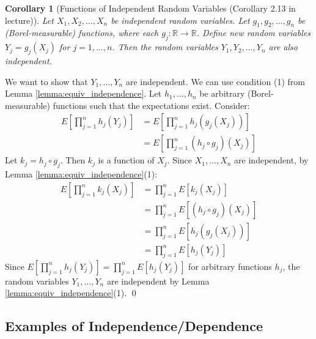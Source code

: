 \documentclass[11pt]{article}
\newtheorem{corollary}[theorem]{Corollary}
\renewenvironment{proof}{{\bfseries Proof.}}{\qed\par\bigskip}
\begin{document}
\begin{corollary}[Functions of Independent Random Variables (Corollary 2.13 in lecture)]
\label{cor:functions_independent}
Let $X_1, X_2, \dots, X_n$ be independent random variables. Let $g_1, g_2, \dots, g_n$ be (Borel-measurable) functions, where each $g_j: \mathbb{R} \to \mathbb{R}$. Define new random variables $Y_j = g_j(X_j)$ for $j=1, \dots, n$. Then the random variables $Y_1, Y_2, \dots, Y_n$ are also independent.
\end{corollary}
\begin{proof}
We want to show that $Y_1, \dots, Y_n$ are independent. We can use condition (1) from Lemma \ref{lemma:equiv_independence}. Let $h_1, \dots, h_n$ be arbitrary (Borel-measurable) functions such that the expectations exist. Consider:
\begin{align*}
E\left[\prod_{j=1}^n h_j(Y_j)\right] &= E\left[\prod_{j=1}^n h_j(g_j(X_j))\right] \\
&= E\left[\prod_{j=1}^n (h_j \circ g_j)(X_j)\right]
\end{align*}
Let $k_j = h_j \circ g_j$. Then $k_j$ is a function of $X_j$. Since $X_1, \dots, X_n$ are independent, by Lemma \ref{lemma:equiv_independence}(1):
\begin{align*}
E\left[\prod_{j=1}^n k_j(X_j)\right] &= \prod_{j=1}^n E[k_j(X_j)] \\
&= \prod_{j=1}^n E[(h_j \circ g_j)(X_j)] \\
&= \prod_{j=1}^n E[h_j(g_j(X_j))] \\
&= \prod_{j=1}^n E[h_j(Y_j)]
\end{align*}
Since $E\left[\prod_{j=1}^n h_j(Y_j)\right] = \prod_{j=1}^n E[h_j(Y_j)]$ for arbitrary functions $h_j$, the random variables $Y_1, \dots, Y_n$ are independent by Lemma \ref{lemma:equiv_independence}(1).
\end{proof}

\subsection{Examples of Independence/Dependence}
\end{document}
